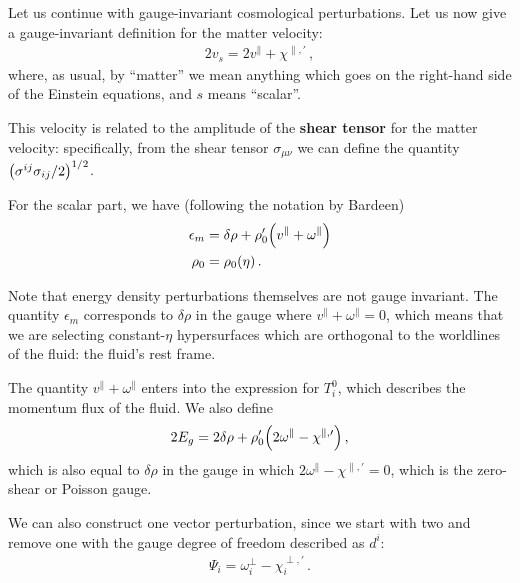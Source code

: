 \documentclass[main.tex]{subfiles}
\begin{document}

Let us continue with gauge-invariant cosmological perturbations.
Let us now give a gauge-invariant definition for the matter velocity: 
%
\begin{align} \label{eq:matter-velocity-gauge-invariant}
2 v _{s} = 2 v^{\parallel} + \chi^{\parallel, \prime}
\,,
\end{align}
%
where, as usual, by ``matter'' we mean anything which goes on the right-hand side of the Einstein equations, and \(s\) means ``scalar''. 

This velocity is related to the amplitude of the \textbf{shear tensor} for the matter velocity: specifically, from the shear tensor \(\sigma_{\mu \nu }\) we can define the quantity \(\qty(\sigma^{ij} \sigma_{ij} /2 )^{1/2}\). 

For the scalar part, we have (following the notation by Bardeen)
%
\begin{align}
\epsilon_m &= \delta \rho + \rho_0' \qty(v^{\parallel} + \omega^{\parallel} )  \\
\rho_0 &= \rho_0 (\eta )
\,.
\end{align}

Note that energy density perturbations themselves are not gauge invariant. 
The quantity \(\epsilon _m\) corresponds to \(\delta \rho \) in the gauge where \(v^{\parallel} + \omega^{\parallel} = 0\), which means that we are selecting constant-\(\eta \) hypersurfaces which are orthogonal to the worldlines of the fluid: the fluid's rest frame. 

The quantity \(v^{\parallel} + \omega^{\parallel}\) enters into the expression for \(T^{0}_{i}\), which describes the momentum flux of the fluid. 
We also define 
%
\begin{align}
2 E_g = 2 \delta \rho + \rho_0' \qty(2 \omega^{\parallel} - \chi^{\parallel, \prime})
\,,
\end{align}
%
which is also equal to \(\delta \rho \) in the gauge in which \(2 \omega^{\parallel} - \chi^{\parallel, \prime} = 0\), which is the zero-shear or Poisson gauge. 

We can also construct one vector perturbation, since we start with two and remove one with the gauge degree of freedom described as \(d^{i}\): 
%
\begin{align}
\Psi_i = \omega^{\perp}_i - \chi_i^{\perp, \prime}
\,.
\end{align}
\end{document}
